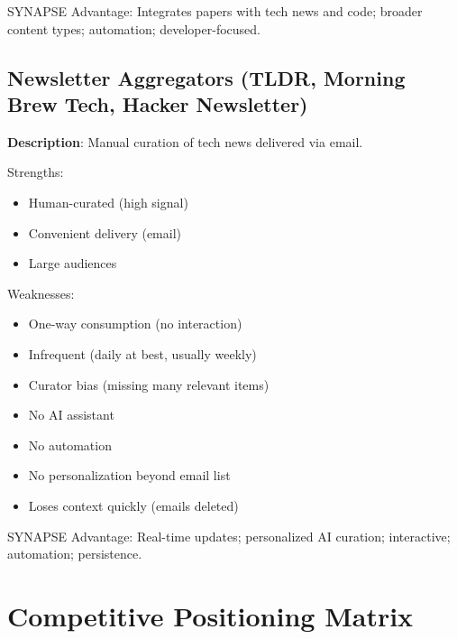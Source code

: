 \documentclass{report}
\begin{document}
SYNAPSE Advantage: Integrates papers with tech news and code; broader content types; automation; developer-focused.

\subsection{Newsletter Aggregators (TLDR, Morning Brew Tech, Hacker Newsletter)}

\textbf{Description}: Manual curation of tech news delivered via email.

Strengths:
\begin{itemize}
    \item Human-curated (high signal)
    \item Convenient delivery (email)
    \item Large audiences
\end{itemize}

Weaknesses:
\begin{itemize}
    \item One-way consumption (no interaction)
    \item Infrequent (daily at best, usually weekly)
    \item Curator bias (missing many relevant items)
    \item No AI assistant
    \item No automation
    \item No personalization beyond email list
    \item Loses context quickly (emails deleted)
\end{itemize}

SYNAPSE Advantage: Real-time updates; personalized AI curation; interactive; automation; persistence.

\section{Competitive Positioning Matrix}
\end{document}
